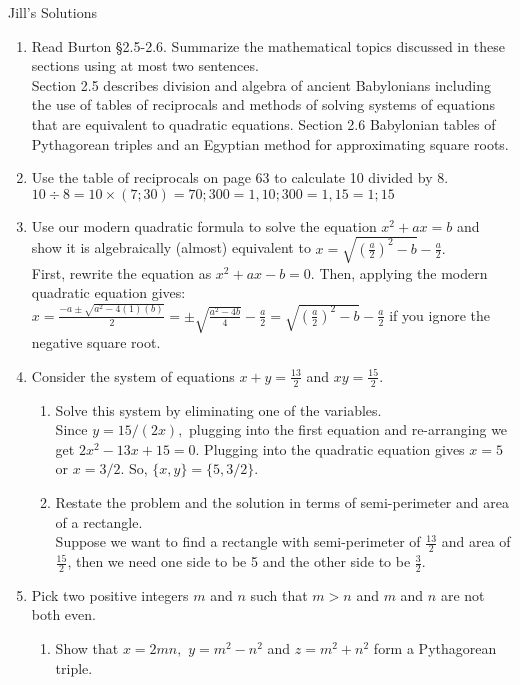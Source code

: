 \documentclass[12pt]{article}
\begin{document}
\begin{center} Jill's Solutions \end{center}

\begin{enumerate}
\item Read Burton \S 2.5-2.6. Summarize the mathematical topics discussed in these sections using at most two sentences.\\

Section 2.5 describes division and algebra of ancient Babylonians including the use of tables of reciprocals and methods of solving systems of equations that are equivalent to quadratic equations. Section 2.6 Babylonian tables of Pythagorean triples and an Egyptian method for approximating square roots.\\

\item Use the table of reciprocals on page 63 to calculate 10 divided by 8.\\

$10 \div 8 = 10 \times (7;30)=70;300=1,10;300=1,15=1;15$
\vfill
\item Use our modern quadratic formula to solve the equation $x^2+ax=b$ and show it is algebraically (almost) equivalent to $x=\sqrt{\left(\frac{a}{2}\right)^2-b}-\frac{a}{2}.$\\

First, rewrite the equation as $x^2+ax-b=0.$ Then, applying the modern quadratic equation gives: \\

$x=\displaystyle{\frac{-a \pm \sqrt{a^2-4(1)(b)}}{2}=\pm \sqrt{\frac{a^2-4b}{4}}-\frac{a}{2}=\sqrt{\left(\frac{a}{2}\right)^2-b}-\frac{a}{2}}$ if you ignore the negative square root.
\vfill
\item Consider the system of equations $x+y=\frac{13}{2}$ and $xy=\frac{15}{2}$.
	\begin{enumerate}
	\item Solve this system by eliminating one of the variables.\\
	
	Since $y=15/(2x),$ plugging into the first equation and re-arranging we get $2x^2-13x+15=0.$ Plugging into the quadratic equation gives $x=5$ or $x=3/2.$ So, $\{x,y\}=\{5,3/2\}.$
	\vfill
	\item Restate the problem and the solution in terms of semi-perimeter and area of a rectangle.\\
	
	Suppose we want to find a rectangle with semi-perimeter of $\frac{13}{2}$ and area of $\frac{15}{2}$, then we need one side to be 5 and the other side to be $\frac{3}{2}.$
	\vfill
	\end{enumerate}
\item Pick two positive integers $m$ and $n$ such that $m>n$ and $m$ and $n$ are not both even.
	\begin{enumerate}
	\item Show that $x=2mn,$ $y=m^2-n^2$ and $z=m^2+n^2$ form a Pythagorean triple.\\
	

\end{enumerate}
\end{enumerate}
\end{document}

